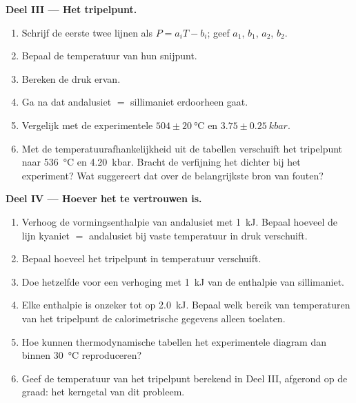 \begin{problem}
\noindent\textbf{Deel III --- Het tripelpunt.}
\begin{enumerate}[resume]
\item Schrijf de eerste twee lijnen als $P = a_i T - b_i$; geef $a_1$, $b_1$, $a_2$, $b_2$.
\item Bepaal de temperatuur van hun snijpunt.
\item Bereken de druk ervan.
\item Ga na dat andalusiet $=$ sillimaniet erdoorheen gaat.
\item Vergelijk met de experimentele $504 \pm \qty{20}{\celsius}$ en $3.75 \pm
\qty{0.25}{kbar}$.
\item Met de temperatuurafhankelijkheid uit de tabellen verschuift het tripelpunt naar
\qty{536}{\celsius} en \qty{4.20}{kbar}. Bracht de verfijning het dichter bij het
experiment? Wat suggereert dat over de belangrijkste bron van fouten?
\end{enumerate}

\noindent\textbf{Deel IV --- Hoever het te vertrouwen is.}
\begin{enumerate}[resume]
\item Verhoog de vormingsenthalpie van andalusiet met \qty{1}{kJ}. Bepaal hoeveel
de lijn kyaniet $=$ andalusiet bij vaste temperatuur in druk verschuift.
\item Bepaal hoeveel het tripelpunt in temperatuur verschuift.
\item Doe hetzelfde voor een verhoging met \qty{1}{kJ} van de enthalpie van sillimaniet.
\item Elke enthalpie is onzeker tot op \qty{2.0}{kJ}. Bepaal welk bereik van temperaturen van het
tripelpunt de calorimetrische gegevens alleen toelaten.
\item Hoe kunnen thermodynamische tabellen het experimentele diagram dan binnen
\qty{30}{\celsius} reproduceren?
\item Geef de temperatuur van het tripelpunt berekend in Deel III, afgerond op de
graad: het kerngetal van dit probleem.
\end{enumerate}
\end{problem}
